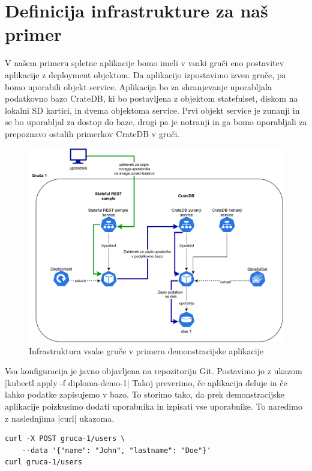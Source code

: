 \documentclass[a4paper, 12pt]{book}
\begin{document}
\section{Definicija infrastrukture za naš primer}
V našem primeru spletne aplikacije bomo imeli v vsaki gruči eno postavitev aplikacije  z deployment objektom. 
Da aplikacijo izpostavimo izven gruče, pa bomo uporabili objekt service.
Aplikacija bo za shranjevanje uporabljala podatkovno bazo CrateDB, ki bo postavljena z objektom statefulset, diskom na lokalni SD kartici, in dvema objektoma service.
Prvi objekt service je zunanji in se bo uporabljal za dostop do baze, drugi pa je notranji in ga bomo uporabljali za prepoznavo ostalih primerkov CrateDB v gruči.
\begin{figure}[h]
\begin{center}
\includegraphics[width=1.0\textwidth]{images/infrastructure-example.pdf}
\end{center}
\caption{Infrastruktura vsake gruče v primeru demonstracijske aplikacije}
\label{infrastructure-example}
\end{figure}
Vsa konfiguracija je javno objavljena na repozitoriju Git\cite{git-diploma}.
Postavimo jo z ukazom \spverb|kubectl apply -f diploma-demo-1|
Takoj preverimo, če aplikacija deluje in če lahko podatke zapisujemo v bazo.
To storimo tako, da prek demonstracijske aplikacije poizkusimo dodati uporabnika in izpisati vse uporabnike.
To naredimo z naslednjima \spverb|curl| ukazoma.
\begin{verbatim}
curl -X POST gruca-1/users \
    --data '{"name": "John", "lastname": "Doe"}'
curl gruca-1/users
\end{verbatim}
\end{document}
